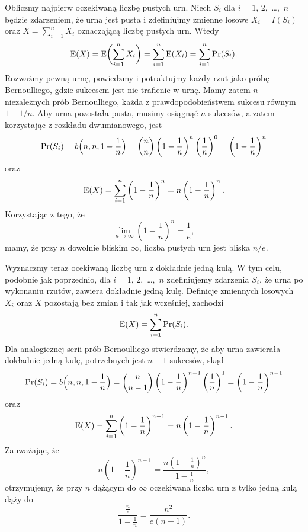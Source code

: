 
\exercise{} %
\exercise{} %
\exercise{} %
\exercise{} %
\exercise{} %
\exercise{} %
\noindent Obliczmy najpierw oczekiwaną liczbę pustych urn. Niech $S_i$ dla $i=1$, 2,~\dots,~$n$ będzie zdarzeniem, że  urna jest pusta i zdefiniujmy zmienne losowe $X_i=I(S_i)$ oraz $X=\sum_{i=1}^nX_i$ oznaczającą liczbę pustych urn. Wtedy
\[
	\operatorname{E}(X) = \operatorname{E}\biggl(\sum_{i=1}^nX_i\biggr) = \sum_{i=1}^n\operatorname{E}(X_i) = \sum_{i=1}^n\Pr(S_i).
\]
Rozważmy pewną urnę, powiedzmy  i potraktujmy każdy rzut jako próbę Bernoulliego, gdzie sukcesem jest nie trafienie w  urnę. Mamy zatem $n$ niezależnych prób Bernoulliego, każda z prawdopodobieństwem sukcesu równym $1-1/n$. Aby  urna pozostała pusta, musimy osiągnąć $n$ sukcesów, a zatem korzystając z rozkładu dwumianowego, jest
\[
	\Pr(S_i) = b\Bigl(n,n,1-\frac{1}{n}\Bigr) = \binom{n}{n}\left(1-\frac{1}{n}\right)^n\left(\frac{1}{n}\right)^0 = \left(1-\frac{1}{n}\right)^n
\]
oraz
\[
	\operatorname{E}(X) = \sum_{i=1}^n\left(1-\frac{1}{n}\right)^n = n\left(1-\frac{1}{n}\right)^n.
\]
Korzystając z tego, że
\[
	\lim_{n\to\infty}\left(1-\frac{1}{n}\right)^n = \frac{1}{e},
\]
mamy, że przy $n$ dowolnie bliskim $\infty$, liczba pustych urn jest bliska $n/e$.

Wyznaczmy teraz ocekiwaną liczbę urn z dokładnie jedną kulą. W tym celu, podobnie jak poprzednio, dla $i=1$, 2,~\dots,~$n$ zdefiniujemy zdarzenia $S_i$, że  urna po wykonaniu rzutów, zawiera dokładnie jedną kulę. Definicje zmiennych losowych $X_i$ oraz $X$ pozostają bez zmian i tak jak wcześniej, zachodzi
\[
	\operatorname{E}(X) = \sum_{i=1}^n\Pr(S_i).
\]
Dla analogicznej serii prób Bernoulliego stwierdzamy, że aby  urna zawierała dokładnie jedną kulę, potrzebnych jest $n-1$ sukcesów, skąd
\[
	\Pr(S_i) = b\Bigl(n,n,1-\frac{1}{n}\Bigr) = \binom{n}{n-1}\left(1-\frac{1}{n}\right)^{n-1}\left(\frac{1}{n}\right)^1 = \left(1-\frac{1}{n}\right)^{n-1}
\]
oraz
\[
	\operatorname{E}(X) = \sum_{i=1}^n\left(1-\frac{1}{n}\right)^{n-1} = n\left(1-\frac{1}{n}\right)^{n-1}.
\]
Zauważając, że
\[
	n\left(1-\frac{1}{n}\right)^{n-1} = \frac{n\left(1-\frac{1}{n}\right)^n}{1-\frac{1}{n}},
\]
otrzymujemy, że przy $n$ dążącym do $\infty$ oczekiwana liczba urn z tylko jedną kulą dąży do
\[
	\frac{\frac{n}{e}}{1-\frac{1}{n}} = \frac{n^2}{e(n-1)}.
\]

\exercise{} %

\problems

